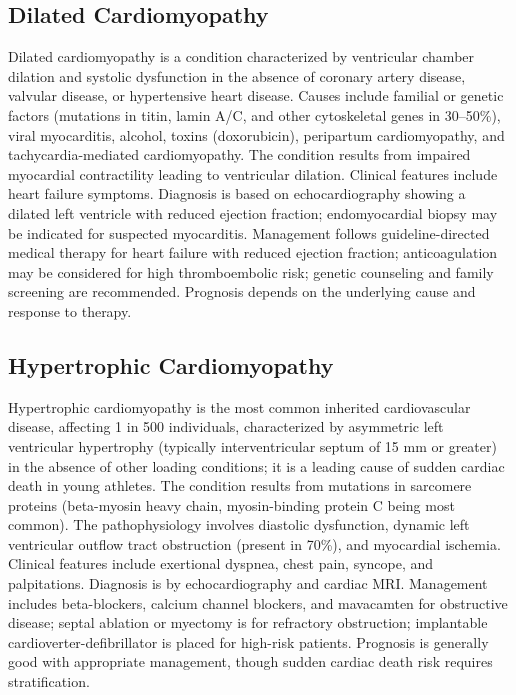 

\label{sec:Cardiomyopathies}

\subsection{Dilated Cardiomyopathy}
\label{sec:Dilated Cardiomyopathy}
Dilated cardiomyopathy is a condition characterized by ventricular chamber dilation and systolic dysfunction in the absence of coronary artery disease, valvular disease, or hypertensive heart disease. Causes include familial or genetic factors (mutations in titin, lamin A/C, and other cytoskeletal genes in 30--50\%), viral myocarditis, alcohol, toxins (doxorubicin), peripartum cardiomyopathy, and tachycardia-mediated cardiomyopathy. The condition results from impaired myocardial contractility leading to ventricular dilation. Clinical features include heart failure symptoms. Diagnosis is based on echocardiography showing a dilated left ventricle with reduced ejection fraction; endomyocardial biopsy may be indicated for suspected myocarditis. Management follows guideline-directed medical therapy for heart failure with reduced ejection fraction; anticoagulation may be considered for high thromboembolic risk; genetic counseling and family screening are recommended. Prognosis depends on the underlying cause and response to therapy.

\subsection{Hypertrophic Cardiomyopathy}
\label{sec:Hypertrophic Cardiomyopathy}
Hypertrophic cardiomyopathy is the most common inherited cardiovascular disease, affecting 1 in 500 individuals, characterized by asymmetric left ventricular hypertrophy (typically interventricular septum of 15 mm or greater) in the absence of other loading conditions; it is a leading cause of sudden cardiac death in young athletes. The condition results from mutations in sarcomere proteins (beta-myosin heavy chain, myosin-binding protein C being most common). The pathophysiology involves diastolic dysfunction, dynamic left ventricular outflow tract obstruction (present in 70\%), and myocardial ischemia. Clinical features include exertional dyspnea, chest pain, syncope, and palpitations. Diagnosis is by echocardiography and cardiac MRI. Management includes beta-blockers, calcium channel blockers, and mavacamten for obstructive disease; septal ablation or myectomy is for refractory obstruction; implantable cardioverter-defibrillator is placed for high-risk patients. Prognosis is generally good with appropriate management, though sudden cardiac death risk requires stratification.

